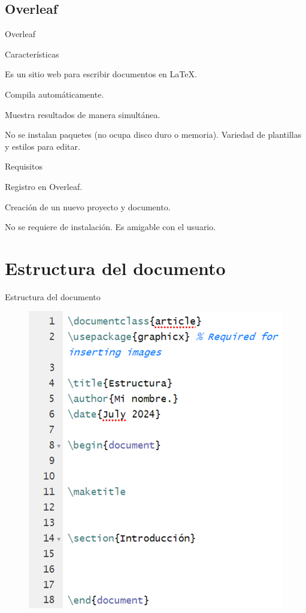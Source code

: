 \documentclass[aspectratio=169, 10pt]{beamer}
\begin{document}
\subsection{Overleaf}
\begin{frame}{Overleaf}
    \begin{alertblock}{Características}
        \item Es un sitio web para escribir documentos en \LaTeX.
        \item Compila automáticamente.
        \item Muestra resultados de manera simultánea.
        \item No se instalan paquetes (no ocupa disco duro o memoria). Variedad de plantillas y estilos para editar.
    \end{alertblock}
    \begin{alertblock}{Requisitos}
        \item Registro en Overleaf.
        \item Creación de un nuevo proyecto y documento.
        \item No se requiere de instalación. Es amigable con el usuario.
    \end{alertblock}
\end{frame}


\section{Estructura del documento}
\begin{frame}[fragile]{Estructura del documento}

\begin{figure}
    \centering
    \includegraphics[scale=0.32]{Estructura1.png} 
    \label{fig:enter-label}
\end{figure}
\end{frame}
\end{document}
